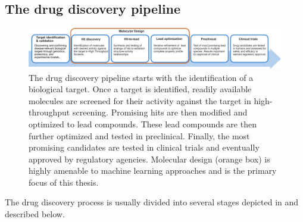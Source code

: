 \subsection{The drug discovery pipeline}
\begin{figure}
      \centering
      \includegraphics[width=\textwidth]{figures/drug-discovery-pipeline_v2.pdf}
      \caption{The drug discovery pipeline starts with the identification of a biological target.
            Once a target is identified, readily available molecules are screened for their activity
            against the target in high-throughput screening. Promising hits are then modified and
            optimized to lead compounds. These lead compounds are then further optimized and tested
            in preclinical. Finally, the most promising candidates are tested in clinical trials and
            eventually approved by regulatory agencies. Molecular design (orange box) is highly amenable to
            machine learning approaches and is the primary focus of this thesis.\label{fig:drug-discovery-pipeline}}
\end{figure}

The drug discovery process is usually divided into several stages \citep{todo} depicted in
 and described below.

